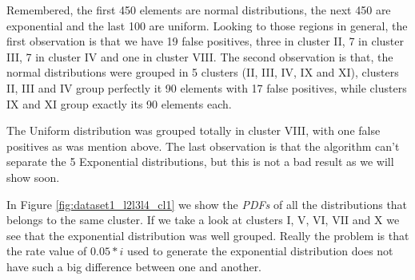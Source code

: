 Remembered, the first 450 elements are normal distributions, the next 450 are exponential and the last 100 are uniform. Looking to those regions in general, the first observation is that we have 19 false positives, three in cluster II, 7 in cluster III, 7 in cluster IV and one in cluster VIII. The second observation is that, the normal distributions were grouped in 5 clusters (II, III, IV, IX and XI), clusters II, III and IV group perfectly it 90 elements with 17 false positives, while clusters IX and XI group exactly its 90 elements each.

The Uniform distribution was grouped totally in cluster VIII, with one false positives as was mention above. The last observation is that the algorithm can't separate the 5 Exponential distributions, but this is not a bad result as we will show soon. 

In Figure \ref{fig:dataset1_l2l3l4_cl1} we show the \textit{PDFs} of all the distributions that belongs to the same cluster. If we take a look at clusters I, V, VI, VII and X we see that the exponential distribution was well grouped. Really the problem is that the rate value of $0.05*i$ used to generate the exponential distribution does not have such a big difference between one and another.  

